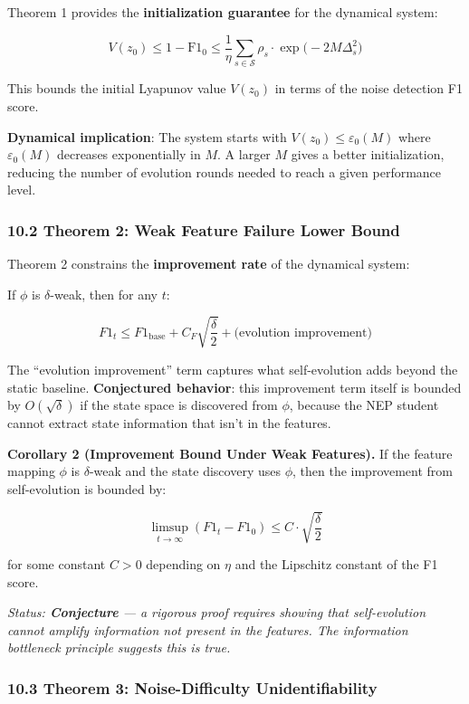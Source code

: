 \documentclass[
  12pt,
]{article}
\begin{document}
Theorem 1 provides the \textbf{initialization guarantee} for the
dynamical system:

\[V(z_0) \leq 1 - \text{F1}_0 \leq \frac{1}{\eta} \sum_{s \in \mathcal{S}} \rho_s \cdot \exp\bigl(-2M\Delta_s^2\bigr)\]

This bounds the initial Lyapunov value \(V(z_0)\) in terms of the noise
detection F1 score.

\textbf{Dynamical implication}: The system starts with
\(V(z_0) \leq \varepsilon_0(M)\) where \(\varepsilon_0(M)\) decreases
exponentially in \(M\). A larger \(M\) gives a better initialization,
reducing the number of evolution rounds needed to reach a given
performance level.

\subsubsection{10.2 Theorem 2: Weak Feature Failure Lower
Bound}\label{theorem-2-weak-feature-failure-lower-bound}

Theorem 2 constrains the \textbf{improvement rate} of the dynamical
system:

If \(\phi\) is \(\delta\)-weak, then for any \(t\):

\[F1_t \leq F1_{\text{base}} + C_F \sqrt{\frac{\delta}{2}} + \text{(evolution improvement)}\]

The ``evolution improvement'' term captures what self-evolution adds
beyond the static baseline. \textbf{Conjectured behavior}: this
improvement term itself is bounded by \(O(\sqrt{\delta})\) if the state
space is discovered from \(\phi\), because the NEP student cannot
extract state information that isn't in the features.

\textbf{Corollary 2 (Improvement Bound Under Weak Features).} If the
feature mapping \(\phi\) is \(\delta\)-weak and the state discovery uses
\(\phi\), then the improvement from self-evolution is bounded by:

\[\limsup_{t \to \infty} (F1_t - F1_0) \leq C \cdot \sqrt{\frac{\delta}{2}}\]

for some constant \(C > 0\) depending on \(\eta\) and the Lipschitz
constant of the F1 score.

\emph{Status: \textbf{Conjecture} --- a rigorous proof requires showing
that self-evolution cannot amplify information not present in the
features. The information bottleneck principle suggests this is true.}

\subsubsection{10.3 Theorem 3: Noise-Difficulty
Unidentifiability}\label{theorem-3-noise-difficulty-unidentifiability}
\end{document}
